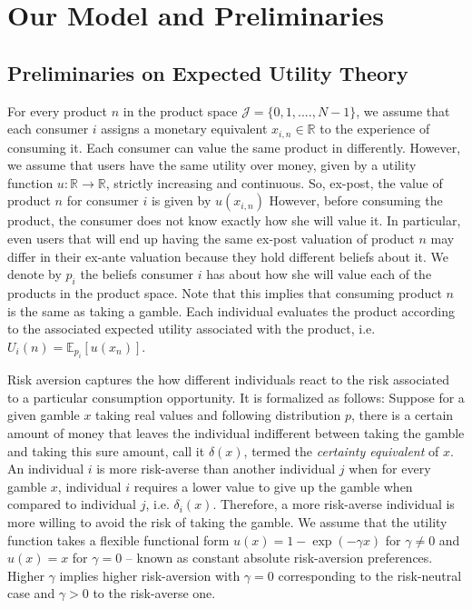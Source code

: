 \documentclass[sigconf]{acmart}
\begin{document}
\section{Our Model and Preliminaries}

\subsection{Preliminaries on Expected Utility Theory}
\noindent For every product $n$ in the product space $\mathcal J=\{0,1,....,N-1\}$, we assume that each consumer $i$ assigns a monetary equivalent $x_{i,n} \in \mathbb R$ to the experience of consuming it. Each consumer can value the same product in differently. However, we assume that users have the same utility over money, given by a utility function $u: \mathbb R \to \mathbb R$, strictly increasing and continuous. So, ex-post, the value of product $n$ for consumer $i$ is given by $u(x_{i,n})$ However, before consuming the product, the consumer does not know exactly how she will value it. In particular, even users that will end up having the same ex-post valuation of product $n$ may differ in their ex-ante valuation because they hold different beliefs about it. We denote by $p_{i}$ the beliefs consumer $i$ has about how she will value each of the products in the product space. Note that this implies that consuming product $n$ is the same as taking a gamble. Each individual evaluates the product according to the associated expected utility associated with the product, i.e. $U_i(n)=\mathbb E_{p_i}[u(x_n)]$. 
\par

Risk aversion captures the how different individuals react to the risk associated to a particular consumption opportunity. It is formalized as follows: Suppose for a given gamble $x$ taking real values and following distribution $p$, there is a certain amount of money that leaves the individual indifferent between taking the gamble and taking this sure amount, call it $\delta(x)$, termed the \textit{certainty equivalent} of $x$. An individual $i$ is more risk-averse than another individual $j$ when for every gamble $x$, individual $i$ requires a lower value to give up the gamble when compared to individual $j$, i.e. $\delta_i(x)$. Therefore, a more risk-averse individual is more willing to avoid the risk of taking the gamble. We assume that the utility function takes a flexible functional form $u(x)=1-\exp(-\gamma x)$ for $\gamma\ne0$ and $u(x)=x$ for $\gamma=0$ -- known as constant absolute risk-aversion preferences. Higher $\gamma$ implies higher risk-aversion with $\gamma=0$ corresponding to the risk-neutral case and $\gamma>0$ to the risk-averse one.
\par
\end{document}

